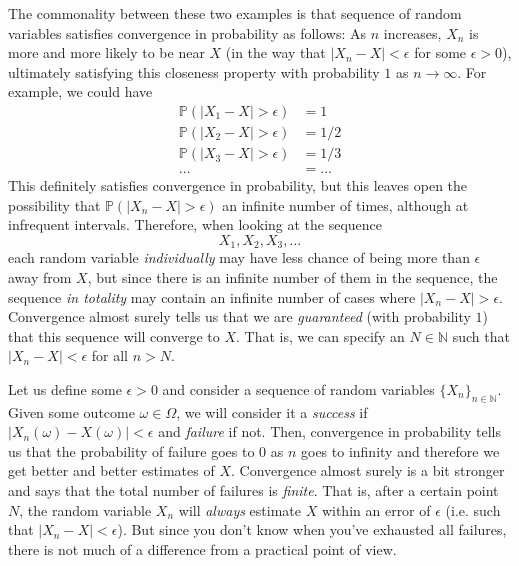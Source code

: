 \documentclass{article}
\begin{document}
      The commonality between these two examples is that sequence of random variables satisfies convergence in probability as follows: As $n$ increases, $X_n$ is more and more likely to be near $X$ (in the way that $|X_n - X| < \epsilon$ for some $\epsilon > 0$), ultimately satisfying this closeness property with probability $1$ as $n \rightarrow \infty$. For example, we could have 
      \begin{align*}
        \mathbb{P}(|X_1 - X| > \epsilon) & = 1 \\
        \mathbb{P}(|X_2 - X| > \epsilon) & = 1/2 \\
        \mathbb{P}(|X_3 - X| > \epsilon) & = 1/3 \\
        \ldots & = \ldots 
      \end{align*}
      This definitely satisfies convergence in probability, but this leaves open the possibility that $\mathbb{P}(|X_n - X| > \epsilon)$ an infinite number of times, although at infrequent intervals. Therefore, when looking at the sequence 
      \begin{equation}
        X_1, X_2, X_3, \ldots
      \end{equation}
      each random variable \textit{individually} may have less chance of being more than $\epsilon$ away from $X$, but since there is an infinite number of them in the sequence, the sequence \textit{in totality} may contain an infinite number of cases where $|X_n - X| > \epsilon$. Convergence almost surely tells us that we are \textit{guaranteed} (with probability $1$) that this sequence will converge to $X$. That is, we can specify an $N \in \mathbb{N}$ such that $|X_n - X| < \epsilon$ for all $n > N$. 

      Let us define some $\epsilon > 0$ and consider a sequence of random variables $\{X_n\}_{n \in \mathbb{N}}$. Given some outcome $\omega \in \Omega$, we will consider it a \textit{success} if $|X_n(\omega) - X(\omega)| < \epsilon$ and \textit{failure} if not. Then, convergence in probability tells us that the probability of failure goes to $0$ as $n$ goes to infinity and therefore we get better and better estimates of $X$. Convergence almost surely is a bit stronger and says that the total number of failures is \textit{finite}. That is, after a certain point $N$, the random variable $X_n$ will \textit{always} estimate $X$ within an error of $\epsilon$ (i.e. such that $|X_n - X| < \epsilon$). But since you don't know when you've exhausted all failures, there is not much of a difference from a practical point of view. 
\end{document}
